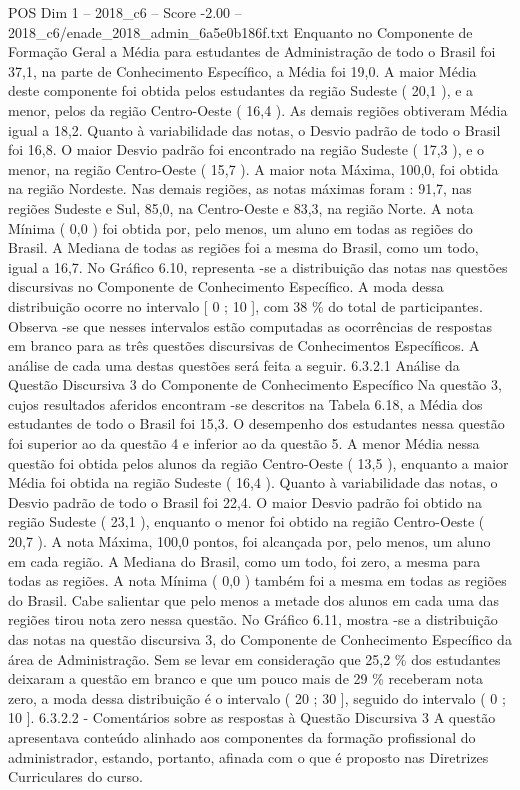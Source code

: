 \begin{textsample}{POS Dim 1 – 2018\_c6 – Score -2.00 – 2018\_c6/enade\_2018\_admin\_6a5e0b186f.txt}
Enquanto no Componente de Formação Geral a Média para estudantes de Administração de todo o Brasil foi 37,1, na parte de Conhecimento Específico, a Média foi 19,0.
A maior Média deste componente foi obtida pelos estudantes da região Sudeste ( 20,1 ), e a menor, pelos da região Centro-Oeste ( 16,4 ).
As demais regiões obtiveram Média igual a 18,2.
Quanto à variabilidade das notas, o Desvio padrão de todo o Brasil foi 16,8.
O maior Desvio padrão foi encontrado na região Sudeste ( 17,3 ), e o menor, na região Centro-Oeste ( 15,7 ).
A maior nota Máxima, 100,0, foi obtida na região Nordeste.
Nas demais regiões, as notas máximas foram : 91,7, nas regiões Sudeste e Sul, 85,0, na Centro-Oeste e 83,3, na região Norte.
A nota Mínima ( 0,0 ) foi obtida por, pelo menos, um aluno em todas as regiões do Brasil.
A Mediana de todas as regiões foi a mesma do Brasil, como um todo, igual a 16,7.
No Gráfico 6.10, representa -se a distribuição das notas nas questões discursivas no Componente de Conhecimento Específico.
A moda dessa distribuição ocorre no intervalo [ 0 ; 10 ], com 38 \% do total de participantes.
Observa -se que nesses intervalos estão computadas as ocorrências de respostas em branco para as três questões discursivas de Conhecimentos Específicos.
A análise de cada uma destas questões será feita a seguir. 6.3.2.1 Análise da Questão Discursiva 3 do Componente de Conhecimento Específico Na questão 3, cujos resultados aferidos encontram -se descritos na Tabela 6.18, a Média dos estudantes de todo o Brasil foi 15,3.
O desempenho dos estudantes nessa questão foi superior ao da questão 4 e inferior ao da questão 5.
A menor Média nessa questão foi obtida pelos alunos da região Centro-Oeste ( 13,5 ), enquanto a maior Média foi obtida na região Sudeste ( 16,4 ).
Quanto à variabilidade das notas, o Desvio padrão de todo o Brasil foi 22,4.
O maior Desvio padrão foi obtido na região Sudeste ( 23,1 ), enquanto o menor foi obtido na região Centro-Oeste ( 20,7 ).
A nota Máxima, 100,0 pontos, foi alcançada por, pelo menos, um aluno em cada região.
A Mediana do Brasil, como um todo, foi zero, a mesma para todas as regiões.
A nota Mínima ( 0,0 ) também foi a mesma em todas as regiões do Brasil.
Cabe salientar que pelo menos a metade dos alunos em cada uma das regiões tirou nota zero nessa questão.
No Gráfico 6.11, mostra -se a distribuição das notas na questão discursiva 3, do Componente de Conhecimento Específico da área de Administração.
Sem se levar em consideração que 25,2 \% dos estudantes deixaram a questão em branco e que um pouco mais de 29 \% receberam nota zero, a moda dessa distribuição é o intervalo ( 20 ; 30 ], seguido do intervalo ( 0 ; 10 ]. 6.3.2.2 - Comentários sobre as respostas à Questão Discursiva 3 A questão apresentava conteúdo alinhado aos componentes da formação profissional do administrador, estando, portanto, afinada com o que é proposto nas Diretrizes Curriculares do curso.

\end{textsample}
